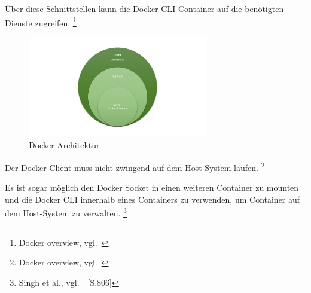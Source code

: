 Über diese Schnittstellen kann die Docker CLI Container auf die benötigten Dienste zugreifen.
\footnote{Docker overview, vgl.~\cite{DOCKER_OVERVIEW}}

\begin{figure}[htb]
    \centering
    \includegraphics[width=0.7\textwidth]{images/docker_architecture.jpg}
    \caption[Docker Architektur]{Docker Architektur}
    \label{fig:Docker Architektur}
\end{figure}


Der Docker Client muss nicht zwingend auf dem Host-System laufen.
\footnote{Docker overview, vgl.~\cite{DOCKER_OVERVIEW}}

Es ist sogar möglich den Docker Socket in einen weiteren Container zu mounten und die Docker CLI innerhalb eines Containers zu verwenden, um Container auf dem Host-System zu verwalten.
\footnote{Singh et al., vgl.~\cite{Singh2017}~[S.806]}



